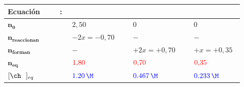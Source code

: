 \begin{exerciseEVAU}
\begin{solu}
        \begin{table}[H]
            \begin{tabular}{@{}C{0.21\linewidth} @{\,}c@{\,} C{0.21\linewidth} @{\,}c@{\,} C{0.21\linewidth} @{\,}c@{\,} C{0.21\linewidth}@{}}
                \toprule
                \textbf{Ecuación} & : & \textbf{} & \ch{->} & \textbf{} & \ch{+} & \textbf{} \\
                \midrule
                \(\bm{n_0}\) &  & \(2{,}50\) &  & \(0\) &  & \(0\) \\[3pt]
                \(\bm{n_{\text{reaccionan}}}\) &  & \(-2x = -0{,}70\) &  & \(-\) &  & \(-\) \\[3pt]
                \(\bm{n_{\text{forman}}}\) &  & \(-\) &  & \(+2x = +0{,}70\) &  & \(+x = +0{,}35\) \\[3pt]
                \(\bm{n_{\text{eq}}}\) &  & \({\color{red}1{,}80}\) &  & \({\color{red}0{,}70}\) &  & \({\color{red}0{,}35}\) \\[3pt]
                \(\conc{\ \ }_{eq}\) &  & \({\color{blue}\qty{1{,}20}{\M}}\) &  & \({\color{blue}\qty{0{,}467}{\M}}\) &  & \({\color{blue}\qty{0{,}233}{\M}}\) \\
                \bottomrule
            \end{tabular}
        \end{table}


\end{solu}
\end{exerciseEVAU}
